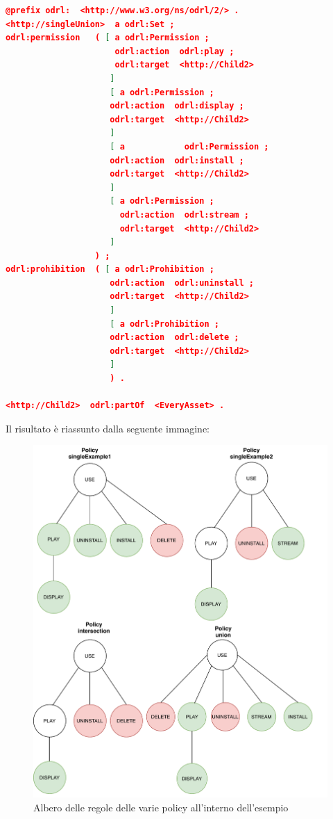 \documentclass[12pt,a4paper,twoside]{book}
\begin{document}
\newpage
\begin{lstlisting}[language=json,firstnumber=1,caption={Risultato dell'unione delle policy nei listing \ref{mergingOnSingle1} e \ref{mergingOnSingle2}},captionpos=b,label=unionSingle]
@prefix odrl:  <http://www.w3.org/ns/odrl/2/> .
<http://singleUnion>  a odrl:Set ;
odrl:permission   ( [ a odrl:Permission ;
                      odrl:action  odrl:play ;
                      odrl:target  <http://Child2>
                     ]
                     [ a odrl:Permission ;
                     odrl:action  odrl:display ;
                     odrl:target  <http://Child2>
                     ]
                     [ a            odrl:Permission ;
                     odrl:action  odrl:install ;
                     odrl:target  <http://Child2>
                     ]
                     [ a odrl:Permission ;
                       odrl:action  odrl:stream ;
                       odrl:target  <http://Child2>
                     ]
                  ) ;
odrl:prohibition  ( [ a odrl:Prohibition ;
                     odrl:action  odrl:uninstall ;
                     odrl:target  <http://Child2>
                     ]
                     [ a odrl:Prohibition ;
                     odrl:action  odrl:delete ;
                     odrl:target  <http://Child2>
                     ]
                     ) .

<http://Child2>  odrl:partOf  <EveryAsset> .

\end{lstlisting}
Il risultato è riassunto dalla seguente immagine:
\begin{figure}[H]
\centering
\includegraphics[scale=.50]{../immagini/singlePolicyExample.pdf}
\caption{Albero delle regole delle varie policy all'interno dell'esempio}
\label{singleResult}
\end{figure}
\end{document}
